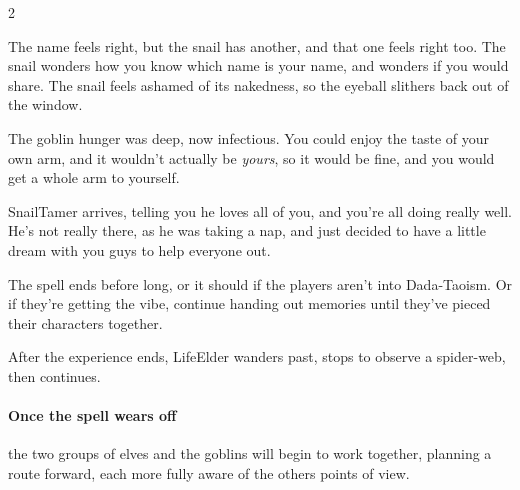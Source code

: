 \begin{multicols}{2}
\begin{boxtext}
    The name feels right, but the snail has another, and that one feels right too.
    The snail wonders how you know which name is your name, and wonders if you would share.
    The snail feels ashamed of its nakedness, so the eyeball slithers back out of the window.


    The goblin hunger was deep, now infectious.
    You could enjoy the taste of your own arm, and it wouldn't actually be \emph{yours}, so it would be fine, and you would get a whole arm to yourself.

    \Gls{SnailTamer} arrives, telling you he loves all of you, and you're all doing really well.
    He's not really there, as he was taking a nap, and just decided to have a little dream with you guys to help everyone out.
\end{boxtext}

The spell ends before long, or it should if the players aren't into Dada-Taoism.
Or if they're getting the vibe, continue handing out memories until they've pieced their characters together.

After the experience ends, \gls{LifeElder} wanders past, stops to observe a spider-web, then continues.

\paragraph{Once the spell wears off}
the two groups of elves and the goblins will begin to work together, planning a route forward, each more fully aware of the others points of view.


\end{multicols}
